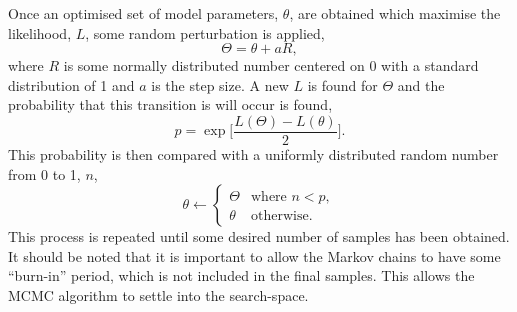 \documentclass[
 reprint,
 superscriptaddress,
 amsmath,amssymb,
 aps,
]{revtex4-1}
\begin{document}
Once an optimised set of model parameters, $\theta$, are obtained which maximise the likelihood, $L$, some random perturbation is applied,
%
\begin{equation}
    \Theta = \theta + aR,
\end{equation}
%
where $R$ is some normally distributed number centered on \num{0} with a standard distribution of \num{1} and $a$ is the step size.
A new $L$ is found for $\Theta$ and the probability that this transition is will occur is found,
%
\begin{equation}
    p = \exp{\bigg[\frac{L(\Theta) - L(\theta)}{2}\bigg]}.
\end{equation}
%
This probability is then compared with a uniformly distributed random number from \num{0} to \num{1}, $n$,
%
\begin{equation}
    \theta \leftarrow
    \begin{cases}
        \Theta & \text{where } n < p,\\
        \theta & \text{otherwise}.
    \end{cases}
\end{equation}
%
This process is repeated until some desired number of samples has been obtained.
It should be noted that it is important to allow the Markov chains to have some ``burn-in'' period, which is not included in the final samples.
This allows the MCMC algorithm to settle into the search-space.
\end{document}
